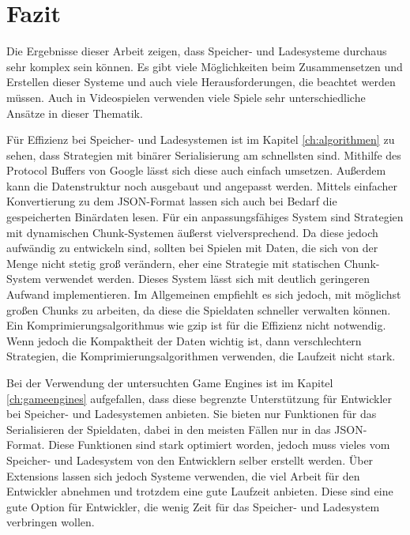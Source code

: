 \chapter{Fazit}\label{ch:fazit}
Die Ergebnisse dieser Arbeit zeigen, dass Speicher- und Ladesysteme durchaus sehr komplex sein können. Es gibt viele Möglichkeiten beim Zusammensetzen und Erstellen dieser Systeme und auch viele Herausforderungen, die beachtet werden müssen. Auch in Videospielen verwenden viele Spiele sehr unterschiedliche Ansätze in dieser Thematik. 

Für Effizienz bei Speicher- und Ladesystemen ist im Kapitel \ref{ch:algorithmen} zu sehen, dass Strategien mit binärer Serialisierung am schnellsten sind. Mithilfe des Protocol Buffers von Google lässt sich diese auch einfach umsetzen. Außerdem kann die Datenstruktur noch ausgebaut und angepasst werden. Mittels einfacher Konvertierung zu dem JSON-Format lassen sich auch bei Bedarf die gespeicherten Binärdaten lesen. Für ein anpassungsfähiges System sind Strategien mit dynamischen Chunk-Systemen äußerst vielversprechend. Da diese jedoch aufwändig zu entwickeln sind, sollten bei Spielen mit Daten, die sich von der Menge nicht stetig groß verändern, eher eine Strategie mit statischen Chunk-System verwendet werden. Dieses System lässt sich mit deutlich geringeren Aufwand implementieren. Im Allgemeinen empfiehlt es sich jedoch, mit möglichst großen Chunks zu arbeiten, da diese die Spieldaten schneller verwalten können. Ein Komprimierungsalgorithmus wie \ac{gzip} ist für die Effizienz nicht notwendig. Wenn jedoch die Kompaktheit der Daten wichtig ist, dann verschlechtern Strategien, die Komprimierungsalgorithmen verwenden, die Laufzeit nicht stark. 

Bei der Verwendung der untersuchten Game Engines ist im Kapitel \ref{ch:gameengines} aufgefallen, dass diese begrenzte Unterstützung für Entwickler bei Speicher- und Ladesystemen anbieten. Sie bieten nur Funktionen für das Serialisieren der Spieldaten, dabei in den meisten Fällen nur in das JSON-Format. Diese Funktionen sind stark optimiert worden, jedoch muss vieles vom Speicher- und Ladesystem von den Entwicklern selber erstellt werden. Über Extensions lassen sich jedoch Systeme verwenden, die viel Arbeit für den Entwickler abnehmen und trotzdem eine gute Laufzeit anbieten. Diese sind eine gute Option für Entwickler, die wenig Zeit für das Speicher- und Ladesystem verbringen wollen.

